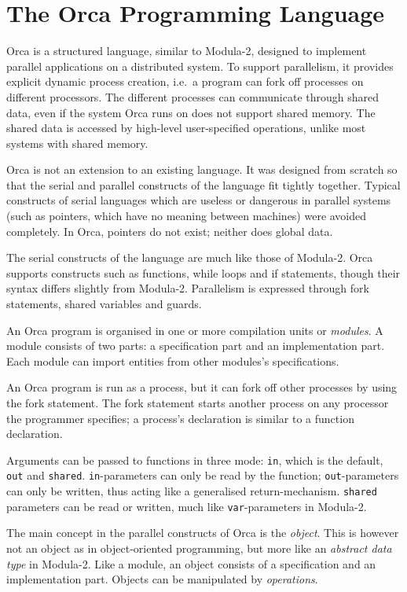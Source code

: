 \section{The Orca Programming Language}
\label{sOrca}
Orca is a structured language, similar to Modula-2, designed to
implement parallel applications on a distributed system. To support
parallelism, it provides explicit dynamic process creation, i.e.\ a
program can fork off processes on different processors.
The different processes can communicate through shared data, even if the
system Orca runs on does not support shared memory. The shared data is
accessed by high-level user-specified operations, unlike most systems
with shared memory.

Orca is not an extension to an existing language. It was designed from
scratch so that the serial and parallel constructs of the language fit
tightly together. Typical constructs of serial languages which
are useless or dangerous
in parallel systems (such as pointers, which have no meaning
between machines) were avoided completely. In Orca, pointers do not
exist; neither does global data.

The serial constructs of the language are much like those of Modula-2.
Orca supports constructs such as functions, while loops and
if statements, though their syntax differs slightly from Modula-2.
Parallelism is expressed through fork statements, shared variables
and guards.

An Orca program is organised in one or more compilation units or
{\em modules}. A  module consists of two parts: a
specification part and an implementation part. Each module can import
entities from other modules's specifications.

An Orca program is run as a process, but it can fork off other processes
by using the fork statement. The fork statement starts
another process on any processor the programmer specifies; a process's
declaration is similar to a function declaration.

Arguments can be passed to functions in three mode: {\tt in}, which is
the default, {\tt out} and {\tt shared}. {\tt in}-parameters can only be
read by the function;  {\tt out}-parameters can only be written, thus
acting like a generalised return-mechanism. {\tt shared} parameters can
be read or written, much like {\tt var}-parameters in Modula-2.

The main concept in the parallel constructs of Orca is the {\em object}.
This is however not an object as in object-oriented programming,
but more like an {\em abstract data type} in Modula-2. Like a module,
an object
consists of a specification and an implementation part. Objects can be
manipulated by {\em operations}.

